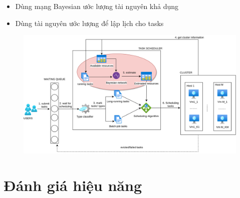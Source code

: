\documentclass[11pt,xcolor={dvipsnames}, aspectratio=169]{beamer}
\begin{document}
\begin{frame}
	\begin{minipage}[t]{0.39\linewidth}
		\vspace{2cm}
		\begin{itemize}
			\item Dùng mạng Bayesian ước lượng tài nguyên khả dụng 
			\item Dùng tài nguyên ước lượng để lập lịch cho tasks
		\end{itemize}
	\end{minipage}
	\hfill
	\begin{minipage}[t]{0.6\linewidth}
	\vspace{0.5cm}
		\begin{figure}
			\centering
			\includegraphics[scale=0.35]{images/bayesian_application.png}		
		\end{figure}			
	\end{minipage}
\end{frame}

\section{Đánh giá hiệu năng} 

\end{document}

